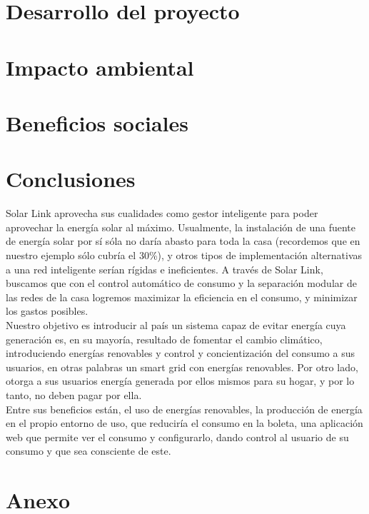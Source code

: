 \documentclass{ol-softwaremanual}
\begin{document}


\section{Desarrollo del proyecto}



\section{Impacto ambiental}



\section{Beneficios sociales}



\section{Conclusiones}

Solar Link aprovecha sus cualidades como gestor inteligente para poder aprovechar la energía solar al máximo. Usualmente, la instalación de una fuente de energía solar por sí sóla no daría abasto para toda la casa (recordemos que en nuestro ejemplo sólo cubría el 30\%), y otros tipos de implementación alternativas a una red inteligente serían rígidas e ineficientes. A través de Solar Link, buscamos que con el control automático de consumo y la separación modular de las redes de la casa logremos maximizar la eficiencia en el consumo, y minimizar los gastos posibles.\\

Nuestro objetivo es introducir al país un sistema capaz de evitar energía cuya generación es, en su mayoría, resultado de fomentar el cambio climático, introduciendo energías renovables y control y concientización del consumo a sus usuarios, en otras palabras un smart grid con energías renovables. Por otro lado, otorga a sus usuarios energía generada por ellos mismos para su hogar, y por lo tanto, no deben pagar por ella. \\

Entre sus beneficios están, el uso de energías renovables, la producción de energía en el propio entorno de uso, que reduciría el consumo en la boleta, una aplicación web que permite ver el consumo y configurarlo, dando control al usuario de su consumo y que sea consciente de este. 

\section{Anexo}


\end{document}
